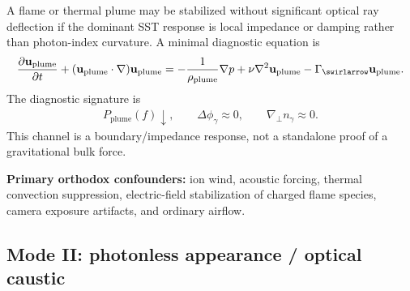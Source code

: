 A flame or thermal plume may be stabilized without significant optical ray
deflection if the dominant SST response is local impedance or damping rather
than photon-index curvature. A minimal diagnostic equation is
\begin{align}
    \frac{\partial\mathbf{u}_{\mathrm{plume}}}{\partial t}
    +
    (\mathbf{u}_{\mathrm{plume}}\cdot\nabla)\mathbf{u}_{\mathrm{plume}}
    =
    -\frac{1}{\rho_{\mathrm{plume}}}\nabla p
    +
    \nu\nabla^2\mathbf{u}_{\mathrm{plume}}
    -
    \Gamma_{\swirlarrow}\mathbf{u}_{\mathrm{plume}}.
    \label{eq:rt_flame_lock_plume_equation}
\end{align}
The diagnostic signature is
\begin{align}
    P_{\mathrm{plume}}(f)\downarrow,
    \qquad
    \Delta\phi_\gamma\approx0,
    \qquad
    \nabla_\perp n_\gamma\approx0.
    \label{eq:rt_flame_lock_signature}
\end{align}
This channel is a boundary/impedance response, not a standalone proof of a
gravitational bulk force.

\textbf{Primary orthodox confounders:}
ion wind, acoustic forcing, thermal convection suppression, electric-field
stabilization of charged flame species, camera exposure artifacts, and ordinary
airflow.

\subsection{Mode II: photonless appearance / optical caustic}


